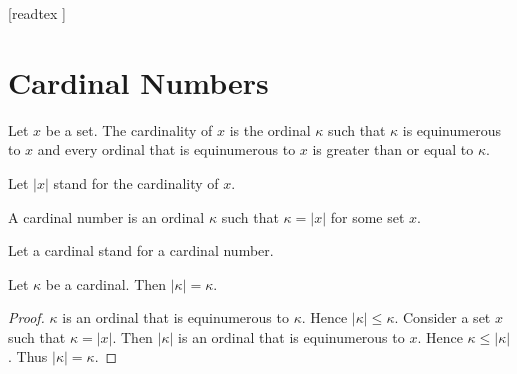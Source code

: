 \documentclass[10pt]{article}
\begin{document}
  \begin{imports}
    \begin{forthel}

      [readtex ]

    \end{forthel}
  \end{imports}


  \section{Cardinal Numbers}

  \begin{forthel}
    \begin{definition}
      Let $x$ be a set.
      The cardinality of $x$ is the ordinal $\kappa$ such that $\kappa$ is
      equinumerous to $x$ and every ordinal that is equinumerous to $x$ is
      greater than or equal to $\kappa$.
    \end{definition}

    Let $|x|$ stand for the cardinality of $x$.
  \end{forthel}

  \begin{forthel}
    \begin{definition}
      A cardinal number is an ordinal $\kappa$ such that $\kappa = |x|$ for some
      set $x$.
    \end{definition}

    Let a cardinal stand for a cardinal number.
  \end{forthel}

  \begin{forthel}
    \begin{proposition}
      Let $\kappa$ be a cardinal.
      Then $|\kappa| = \kappa$.
    \end{proposition}
    \begin{proof}
      $\kappa$ is an ordinal that is equinumerous to $\kappa$.
      Hence $|\kappa| \leq \kappa$.
      Consider a set $x$ such that $\kappa = |x|$.
      Then $|\kappa|$ is an ordinal that is equinumerous to $x$.
      Hence $\kappa \leq |\kappa|$.
      Thus $|\kappa| = \kappa$.
    \end{proof}
  \end{forthel}
\end{document}
